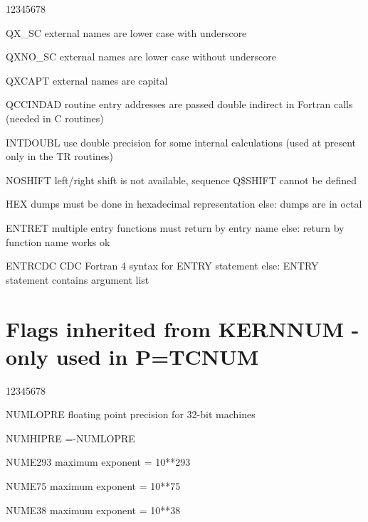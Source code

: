 \begin{DLtt}{12345678}
\item[QX\_SC]     external names are lower case with underscore
\item[QXNO\_SC]   external names are lower case without underscore
\item[QXCAPT]    external names are capital\\

\item[QCCINDAD]  routine entry addresses are passed double indirect
                 in Fortran calls (needed in C routines)\\

\item[INTDOUBL]  use double precision for some internal calculations
                 (used at present only in the TR routines)\\

\item[NOSHIFT]   left/right shift is not available,
                 sequence Q\$SHIFT cannot be defined\\

\item[HEX]       dumps must be done in hexadecimal representation
                 else: dumps are in octal\\

\item[ENTRET]    multiple entry functions must return by entry name
                 else: return by function name works ok\\

\item[ENTRCDC]   CDC Fortran 4 syntax for ENTRY statement
                 else: ENTRY statement contains argument list
\end{DLtt}

\section{Flags inherited from KERNNUM  -  only used in P=TCNUM}
\begin{DLtt}{12345678}
\item[NUMLOPRE]floating point precision for 32-bit machines\\

\item[NUMHIPRE]=-NUMLOPRE\\

\item[NUME293] maximum exponent = 10**293\\
  
\item[NUME75]  maximum exponent = 10**75\\
  
\item[NUME38]  maximum exponent = 10**38\\

\end{DLtt}
